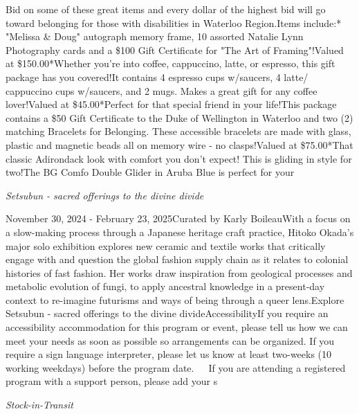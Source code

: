 \documentclass[letterpaper, 10pt]{article}
\newcommand{\subtitle}[1]{\textit{\large #1}\vspace{0.5em}}
\newcommand{\articlecontent}[1]{\small #1\vspace{1em}}
\begin{document}
\begin{multicols}{2}
{Bid on some of these great items and every dollar of the highest bid will go toward belonging for those with disabilities in Waterloo Region.Items include:* "Melissa & Doug" autograph memory frame, 10 assorted Natalie Lynn Photography cards and a \$100 Gift Certificate for "The Art of Framing"!Valued at \$150.00*Whether you're into coffee, cappuccino, latte, or espresso, this gift package has you covered!It contains 4 espresso cups w/saucers, 4 latte/ cappuccino cups w/saucers, and 2 mugs. Makes a great gift for any coffee lover!Valued at \$45.00*Perfect for that special friend in your life!This package contains a \$50 Gift Certificate to the Duke of Wellington in Waterloo and two (2) matching Bracelets for Belonging. These accessible bracelets are made with glass, plastic and magnetic beads all on memory wire - no clasps!Valued at \$75.00*That classic Adirondack look with comfort you don't expect! This is gliding in style for two!The BG Comfo Double Glider in Aruba Blue is perfect for your
}
\vspace{10px}

\subtitle{Setsubun - sacred offerings to the divine divide}

\articlecontent{

\qrcode[height=1.5cm]{https://ideaexchange.libnet.info/event/11297344}
\vspace{10px}

November 30, 2024 - February 23, 2025Curated by Karly BoileauWith a focus on a slow-making process through a Japanese heritage craft practice, Hitoko Okada’s major solo exhibition explores new ceramic and textile works that critically engage with and question the global fashion supply chain as it relates to colonial histories of fast fashion. Her works draw inspiration from geological processes and metabolic evolution of fungi, to apply ancestral knowledge in a present-day context to re-imagine futurisms and ways of being through a queer lens.Explore Setsubun - sacred offerings to the divine divideAccessibilityIf you require an accessibility accommodation for this program or event, please tell us how we can meet your needs as soon as possible so arrangements can be organized. If you require a sign language interpreter, please let us know at least two-weeks (10 working weekdays) before the program date.   If you are attending a registered program with a support person, please add your s
}
\vspace{10px}

\subtitle{Stock-in-Transit}

\articlecontent{

}
\end{multicols}
\end{document}
